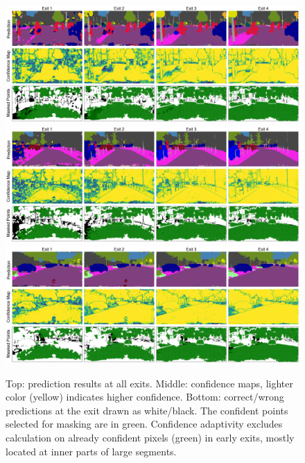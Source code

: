 \begin{figure}[htbp]
\includegraphics[width=\textwidth]{images/vis_supp/visualize_final_frankfurt_000001_037705.png}
\includegraphics[width=\textwidth]{images/vis_supp/visualize_final_frankfurt_000001_064130.png}
\includegraphics[width=\textwidth]{images/vis_supp/visualize_final_frankfurt_000001_080391.png}
\caption{%
Top: prediction results at all exits.
Middle: confidence maps, lighter color (yellow) indicates higher confidence.
Bottom: correct/wrong predictions at the exit drawn as white/black.
The confident points selected for masking are in green.
Confidence adaptivity excludes calculation on already confident pixels (green) in early exits, mostly located at inner parts of large segments.}
\vspace{-2ex}
\label{fig:vis2}
\end{figure}

\clearpage


